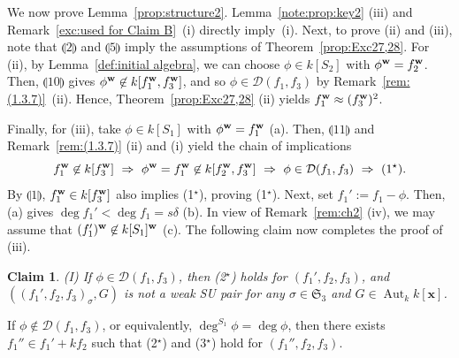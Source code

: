 \documentclass{amsart}
\theoremstyle{plain}
\theoremstyle{definition}
\newtheorem*{klaim}{Claim}
\newcommand{\Aut }{\mathop{\mathrm{Aut}}\nolimits}
\newcommand{\nd}{\noindent}
\newcommand{\x}{{\boldsymbol x}}
\newcommand{\w}{{\bf w}}
\newcommand{\kx}{k[\x]}
\newcommand{\sym}{\mathfrak{S}}
\begin{document}
We now prove Lemma~\ref{prop:structure2}. 
Lemma~\ref{note:prop:key2} (iii) 
and Remark~\ref{exc:used for Claim B}~(i) directly imply~(i). 
Next, to prove (ii) and (iii), 
note that $\llparenthesis 2 \rrparenthesis$ and 
$\llparenthesis 5 \rrparenthesis$ imply 
the assumptions of Theorem~\ref{prop:Exc27,28}. 
For (ii), 
by Lemma~\ref{def:initial algebra}, 
we can choose $\phi \in k[S_2]$ with $\phi ^{\w }=f_2^{\w }$. 
Then, $\llparenthesis 10 \rrparenthesis$ gives 
$\phi ^{\w }\not\in k[f_1^{\w },f_3^{\w }]$, 
and so $\phi \in \mathcal{D}(f_1,f_3)$ 
by Remark~\ref{rem:(1.3.7)}~(ii). 
Hence, Theorem~\ref{prop:Exc27,28} (ii) 
yields $f_1^{\w }\approx (f_3^{\w })^2$. 



Finally, for (iii), 
take $\phi \in k[S_1]$ with $\phi ^{\w }=f_1^{\w }$ (a). 
Then, 
$\llparenthesis 11 \rrparenthesis$ 
and Remark~\ref{rem:(1.3.7)} (ii) and (i) yield 
the chain of implications 
\begin{equation}\label{eq:implication}
f_1^{\w }\not\in k[f_3^{\w }] 
\ \Rightarrow \ 
\phi ^{\w }=f_1^{\w }\not\in k[f_2^{\w },f_3^{\w }]
\ \Rightarrow \ 
\phi \in \mathcal{D}(f_1,f_3) 
\ \Rightarrow \ 
\text{(1$^\star $)}.
\end{equation}
By $\llparenthesis 1 \rrparenthesis$, 
$f_1^{\w }\in k[f_3^{\w }]$ also implies (1$^\star $), 
proving (1$^\star $). 
Next, set $f_1':=f_1-\phi $. 
Then, (a) gives $\deg f_1'<\deg f_1=s\delta $ (b). 
In view of Remark~\ref{rem:ch2} (iv), 
we may assume that $(f_1')^{\w }\not\in k[S_1]^{\w }$ (c). 
The following claim now completes the proof of (iii). 





\begin{klaim}\label{claim:step1}\it 
{\rm (I)} If $\phi \in \mathcal{D}(f_1,f_3)$, 
then {\rm (2$^\star $)} holds for $(f_1',f_2,f_3)$, 
and $((f_1',f_2,f_3)_{\sigma },G)$ is not a weak SU pair 
for any $\sigma \in \sym _3$ and $G\in \Aut _k\kx $. 



\nd {\rm (II)} 
If $\phi \not\in \mathcal{D}(f_1,f_3)$, 
or equivalently, $\deg ^{S_1}\phi =\deg \phi $, 
then there exists $f_1''\in f_1'+kf_2$ 
such that 
{\rm (2$^\star $)} and {\rm (3$^\star $)} 
hold for $(f_1'',f_2,f_3)$. 
\end{klaim}
\end{document}
